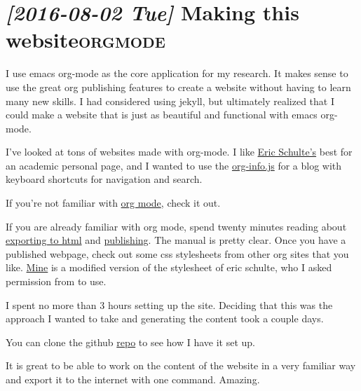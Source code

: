 \documentclass{article}
\begin{document}
\section*{\textit{[2016-08-02 Tue] } Making this website\hfill{}\textsc{orgmode}}
\label{sec:orge2310a1}
I use emacs org-mode as the core application for my research.  It
makes sense to use the great org publishing features to create a
website without having to learn many new skills.  I had considered
using jekyll, but ultimately realized that I could make a website that
is just as beautiful and functional with emacs org-mode.

I've looked at tons of websites made with org-mode.  I like \href{http://cs.unm.edu/\~eschulte/}{Eric
Schulte's} best for an academic personal page, and I wanted to use the
\href{http://orgmode.org/manual/JavaScript-support.html}{org-info.js} for a blog with keyboard shortcuts for navigation and
search.

If you're not familiar with \href{http://orgmode.org/worg/}{org mode}, check it out.

If you are already familiar with org mode, spend twenty minutes
reading about \href{http://orgmode.org/manual/Exporting.html\#Exporting}{exporting to html} and \href{http://orgmode.org/manual/Publishing.html}{publishing}.  The manual is pretty
clear.  Once you have a published webpage, check out some css
stylesheets from other org sites that you like.  \href{data/eric.css}{Mine} is a modified
version of the stylesheet of eric schulte, who I asked permission from
to use.

I spent no more than 3 hours setting up the site.  Deciding that this was the
approach I wanted to take and generating the content took a couple
days.

You can clone the github \href{https://github.com/TedwardErker/webpage}{repo} to see how I have it set up.

It is great to be able to work on the content of the website in a very
familiar way and export it to the internet with one command.  Amazing.
\end{document}
